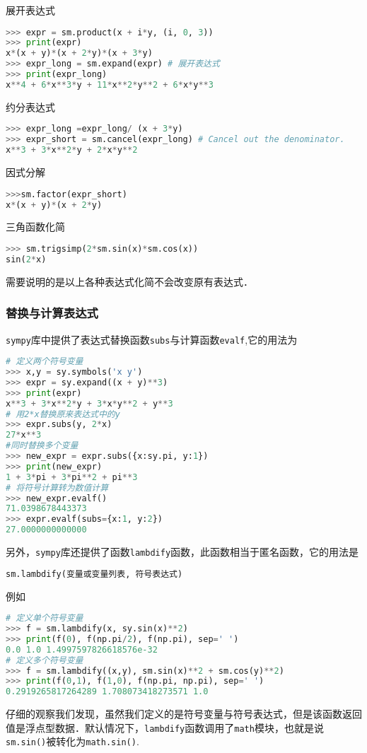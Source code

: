 展开表达式
\begin{lstlisting}[language=python]
>>> expr = sm.product(x + i*y, (i, 0, 3))
>>> print(expr)
x*(x + y)*(x + 2*y)*(x + 3*y)
>>> expr_long = sm.expand(expr) # 展开表达式
>>> print(expr_long)
x**4 + 6*x**3*y + 11*x**2*y**2 + 6*x*y**3
\end{lstlisting}

约分表达式
\begin{lstlisting}[language=python]
 >>> expr_long =expr_long/ (x + 3*y)
>>> expr_short = sm.cancel(expr_long) # Cancel out the denominator.
x**3 + 3*x**2*y + 2*x*y**2
\end{lstlisting}

因式分解
\begin{lstlisting}[language=python]
>>>sm.factor(expr_short) 
x*(x + y)*(x + 2*y)

\end{lstlisting}

三角函数化简
\begin{lstlisting}[language=python]
>>> sm.trigsimp(2*sm.sin(x)*sm.cos(x))
sin(2*x)
\end{lstlisting}
需要说明的是以上各种表达式化简不会改变原有表达式．

\subsubsection{替换与计算表达式}
\verb|sympy|库中提供了表达式替换函数\verb|subs|与计算函数\verb|evalf|,它的用法为
\begin{lstlisting}[language=python]
# 定义两个符号变量
>>> x,y = sy.symbols('x y')
>>> expr = sy.expand((x + y)**3)
>>> print(expr)
x**3 + 3*x**2*y + 3*x*y**2 + y**3
# 用2*x替换原来表达式中的y
>>> expr.subs(y, 2*x)
27*x**3
#同时替换多个变量
>>> new_expr = expr.subs({x:sy.pi, y:1})
>>> print(new_expr)
1 + 3*pi + 3*pi**2 + pi**3
# 将符号计算转为数值计算
>>> new_expr.evalf() 
71.0398678443373
>>> expr.evalf(subs={x:1, y:2})
27.0000000000000
\end{lstlisting}
另外，\verb|sympy|库还提供了函数\verb|lambdify|函数，此函数相当于匿名函数，它的用法是
\begin{lstlisting}[language=python]
 sm.lambdify(变量或变量列表, 符号表达式)
\end{lstlisting}
例如
\begin{lstlisting}[language=python]
# 定义单个符号变量
>>> f = sm.lambdify(x, sy.sin(x)**2)
>>> print(f(0), f(np.pi/2), f(np.pi), sep=' ')
0.0 1.0 1.4997597826618576e-32
# 定义多个符号变量
>>> f = sm.lambdify((x,y), sm.sin(x)**2 + sm.cos(y)**2)
>>> print(f(0,1), f(1,0), f(np.pi, np.pi), sep=' ')
0.2919265817264289 1.708073418273571 1.0
\end{lstlisting}
仔细的观察我们发现，虽然我们定义的是符号变量与符号表达式，但是该函数返回值是浮点型数据．默认情况下，\verb|lambdify|函数调用了\verb|math|模块，也就是说\verb|sm.sin()|被转化为\verb|math.sin()|.

